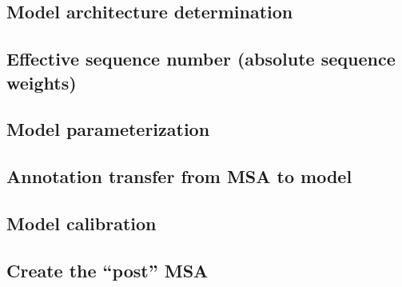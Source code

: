 \subsection{Model architecture determination}

\subsection{Effective sequence number (absolute sequence weights)}

\subsection{Model parameterization}

\subsection{Annotation transfer from MSA to model}

\subsection{Model calibration}

\subsection{Create the ``post'' MSA}















